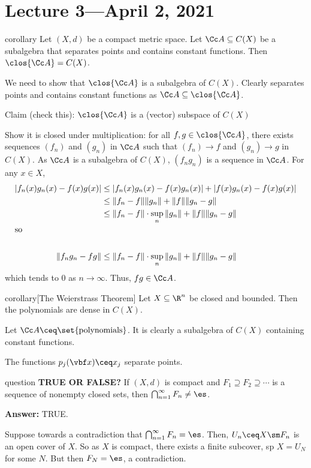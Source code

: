 \documentclass[class=article, crop=false]{standalone}
\begin{document}
\section{Lecture 3---April 2, 2021}

\begin{result}{corollary}
  Let $(X,d)$ be a compact metric space. Let $\Cc A \subseteq C(X)$ be a subalgebra that separates points and contains constant functions. Then $\clos{\Cc A} = C(X)$.
\end{result}
\begin{pf}
  We need to show that $\clos{\Cc A}$ is a subalgebra of $C(X)$. Clearly separates points and contains constant functions as $\Cc A \subseteq \clos{\Cc A}$.

  Claim (check this): $\clos{\Cc A}$ is a (vector) subspace of $C(X)$

  Show it is closed under multiplication: for all $f,g \in \clos{\Cc A}$, there exists sequences $(f_n)$ and $(g_n)$ in $\Cc A$ such that $(f_n) \to f$ and $(g_n) \to g$ in $C(X)$. As $\Cc A$ is a subalgebra of $C(X)$, $(f_ng_n)$ is a sequence in $\Cc A$. For any $x \in X$,
    \begin{align*}
      |f_n(x)g_n(x)-f(x)g(x)| &\leq |f_n(x)g_n(x)-f(x)g_n(x)| + |f(x)g_n(x)-f(x)g(x)| \\
        &\leq \|f_n-f\|\|g_n\| + \|f\| \|g_n-g\| \\
        &\leq \|f_n-f\| \cdot \sup_n \|g_n\| + \|f\| \|g_n-g\| \\
        \intertext{so} \\
        \|f_ng_n-fg\| &\leq \|f_n-f\| \cdot \sup_n \|g_n\| + \|f\| \|g_n-g\|
    \end{align*}
which tends to $0$ as $n \to \infty$. Thus, $fg \in \Cc A$.
\end{pf}

\begin{result}{corollary}[The Weierstrass Theorem]
  Let $X \subseteq \R^n$ be closed and bounded. Then the polynomials are dense in $C(X)$.
\end{result}
\begin{pf}
  Let $\Cc A \ceq \set{\text{polynomials}}$. It is clearly a subalgebra of $C(X)$ containing constant functions.

  The functions $p_j(\vbf x) \ceq x_j$ separate points.
\end{pf}

\begin{understandingcheck}{question}
  \textbf{TRUE OR FALSE?} If $(X,d)$ is compact and $F_1 \supseteq F_2 \supseteq \cdots$ is a sequence of nonempty closed sets, then $\bigcap_{n=1}^{\infty} F_n \neq \es$.

  \textbf{Answer:} TRUE.
    \begin{pf}
      Suppose towards a contradiction that $\bigcap_{n=1}^{\infty} F_n = \es$. Then, $U_n \ceq X \sm F_n$ is an open cover of $X$. So as $X$ is compact, there exists a finite subcover, sp $X = U_N$ for some $N$. But then $F_N = \es$, a contradiction.
    \end{pf}
\end{understandingcheck}
\end{document}

